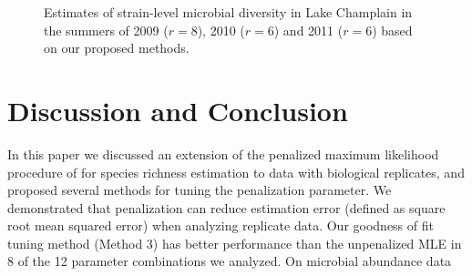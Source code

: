 \documentclass[12pt]{article}
\theoremstyle{break}
\theoremstyle{break}
\begin{document}

\begin{figure}[t]
\caption{Estimates of strain-level microbial diversity in Lake Champlain in the summers of 2009 ($r = 8$), 2010 ($r = 6$) and 2011 ($r = 6$) based on our proposed methods.
%
\label{fig:data_analysis}}
\centering{}
\end{figure}




\section{Discussion and Conclusion}
\label{sec:discussion}

In this paper we discussed an extension of the penalized maximum likelihood procedure of \citet{wang_2005} for species richness estimation to data with biological replicates, and proposed several methods for tuning the penalization parameter.  We demonstrated that penalization can reduce estimation error (defined as square root mean squared error) when analyzing replicate data.  Our goodness of fit tuning method (Method 3) has better performance than the unpenalized MLE in 8 of the 12 parameter combinations we analyzed. On microbial abundance data 
\end{document}
